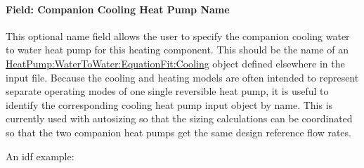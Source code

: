 \paragraph{Field: Companion Cooling Heat Pump Name}\label{field-cooling-companion-name}

This optional name field allows the user to specify the companion cooling water to water heat pump for this heating component. This should be the name of an \hyperref[heatpumpwatertowaterequationfitcooling]{HeatPump:WaterToWater:EquationFit:Cooling} object defined elsewhere in the input file. Because the cooling and heating models are often intended to represent separate operating modes of one single reversible heat pump, it is useful to identify the corresponding cooling heat pump input object by name. This is currently used with autosizing so that the sizing calculations can be coordinated so that the two companion heat pumps get the same design reference flow rates.


An idf example:

